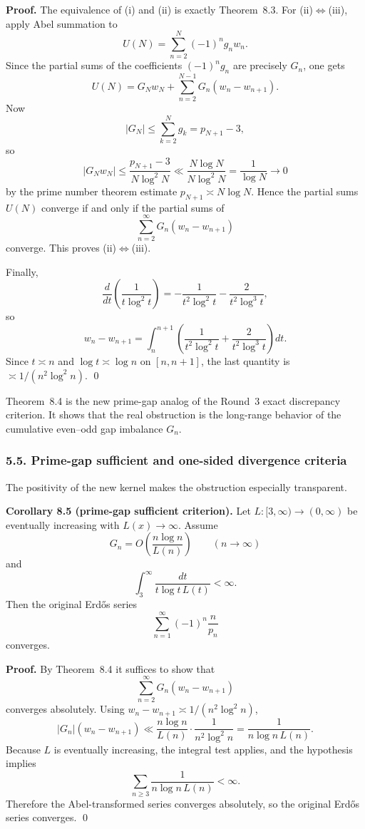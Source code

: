 \textbf{Proof.}
The equivalence of (i) and (ii) is exactly Theorem~8.3.
For (ii)$\Leftrightarrow$(iii), apply Abel summation to
\[
U(N)=\sum_{n=2}^N (-1)^n g_n w_n.
\]
Since the partial sums of the coefficients $(-1)^n g_n$ are precisely $G_n$, one gets
\[
U(N)=G_N w_N + \sum_{n=2}^{N-1} G_n(w_n-w_{n+1}).
\tag{8.8}
\]
Now
\[
|G_N|
\le
\sum_{k=2}^N g_k
=
p_{N+1}-3,
\]
so
\[
|G_N w_N|
\le
\frac{p_{N+1}-3}{N\log^2 N}
\ll
\frac{N\log N}{N\log^2 N}
=
\frac{1}{\log N}
\to 0
\]
by the prime number theorem estimate $p_{N+1}\asymp N\log N$.
Hence the partial sums $U(N)$ converge if and only if the partial sums of
\[
\sum_{n=2}^{\infty} G_n(w_n-w_{n+1})
\]
converge. This proves (ii)$\Leftrightarrow$(iii).

Finally,
\[
\frac{d}{dt}\left(\frac{1}{t\log^2 t}\right)
=
-\frac{1}{t^2\log^2 t}-\frac{2}{t^2\log^3 t},
\]
so
\[
w_n-w_{n+1}
=
\int_n^{n+1}\left(\frac{1}{t^2\log^2 t}+\frac{2}{t^2\log^3 t}\right)dt.
\]
Since $t\asymp n$ and $\log t\asymp \log n$ on $[n,n+1]$, the last quantity is $\asymp 1/(n^2\log^2 n)$. \qed

\medskip

Theorem~8.4 is the new prime-gap analog of the Round~3 exact discrepancy criterion.
It shows that the real obstruction is the long-range behavior of the cumulative even--odd gap imbalance $G_n$.

\subsubsection*{5.5. Prime-gap sufficient and one-sided divergence criteria}

The positivity of the new kernel makes the obstruction especially transparent.

\textbf{Corollary 8.5 (prime-gap sufficient criterion).}
Let $L:[3,\infty)\to(0,\infty)$ be eventually increasing with $L(x)\to\infty$.
Assume
\[
G_n=O\!\left(\frac{n\log n}{L(n)}\right)
\qquad (n\to\infty)
\]
and
\[
\int_3^\infty \frac{dt}{t\log t\,L(t)}<\infty.
\]
Then the original Erd\H{o}s series
\[
\sum_{n=1}^\infty (-1)^n\frac{n}{p_n}
\]
converges.

\textbf{Proof.}
By Theorem~8.4 it suffices to show that
\[
\sum_{n=2}^\infty G_n(w_n-w_{n+1})
\]
converges absolutely.
Using $w_n-w_{n+1}\asymp 1/(n^2\log^2 n)$,
\[
|G_n|(w_n-w_{n+1})
\ll
\frac{n\log n}{L(n)}\cdot \frac{1}{n^2\log^2 n}
=
\frac{1}{n\log n\,L(n)}.
\]
Because $L$ is eventually increasing, the integral test applies, and the hypothesis implies
\[
\sum_{n\ge 3}\frac{1}{n\log n\,L(n)}<\infty.
\]
Therefore the Abel-transformed series converges absolutely, so the original Erd\H{o}s series converges. \qed

